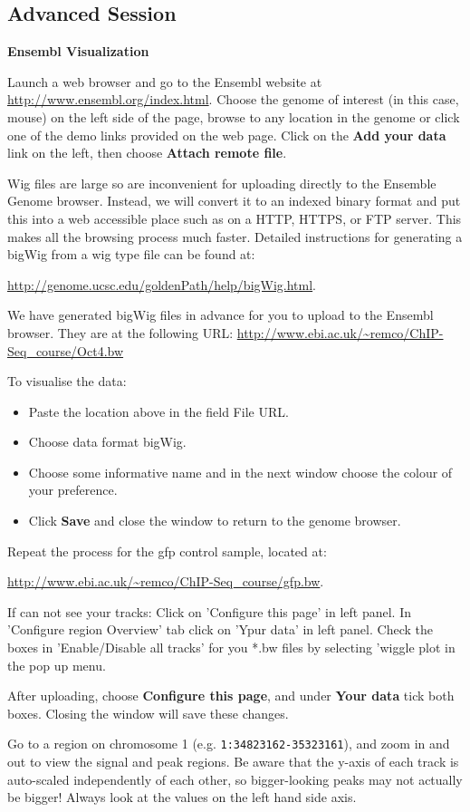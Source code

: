

\subsection{Advanced Session}
\textbf{Ensembl Visualization}

Launch a web browser and go to the Ensembl website at
\url{http://www.ensembl.org/index.html}. Choose the genome of interest (in this case, mouse) on the left side of the
page, browse to any location in the genome or click one of the demo links
provided on the web page. Click on the \textbf{Add your data} link on the left, then choose
\textbf{Attach remote file}.


\begin{note}
Wig files are large so are inconvenient for uploading directly to the Ensemble Genome browser. Instead, we will convert it to an indexed binary format
and put this into a web accessible place such as on a HTTP, HTTPS, or FTP server.
This makes all the browsing process much faster. Detailed
instructions for generating a bigWig from a wig type file can be found at:

\url{http://genome.ucsc.edu/goldenPath/help/bigWig.html}.

\end{note}

\begin{steps}
We have generated bigWig files in advance for you to upload to the Ensembl
browser. They are at the following URL:
\url{http://www.ebi.ac.uk/~remco/ChIP-Seq_course/Oct4.bw}

To visualise the data:
\begin{itemize}
	\item Paste the location above in the field File URL. 
	\item Choose data format bigWig. 
	\item Choose some informative name and in the next window choose the colour of your preference. 
	\item Click \textbf{Save} and close the window to return to the genome browser. 
\end{itemize}
Repeat the process for the gfp control sample, located at:

\url{http://www.ebi.ac.uk/~remco/ChIP-Seq_course/gfp.bw}.

If can not see your tracks: 
 Click on 'Configure this page' in left panel.
 In 'Configure region Overview' tab click on 'Ypur data' in left panel.
 Check the boxes in 'Enable/Disable all tracks' for you *.bw files by selecting 'wiggle plot in the pop up menu.
 
After uploading, choose \textbf{Configure this page}, and under \textbf{Your
data} tick both boxes. Closing the window will save these changes.

Go to a region on chromosome 1 (e.g. \texttt{1:34823162-35323161}), and zoom in and out
to view the signal and peak regions. Be aware that the y-axis of each track is auto-scaled independently of each other,
so bigger-looking peaks may not actually be bigger! Always look at the values
on the left hand side axis.
\end{steps}

